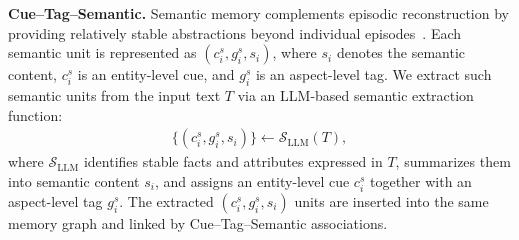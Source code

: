 \textbf{Cue--Tag--Semantic.}
Semantic memory complements episodic reconstruction by providing relatively stable abstractions beyond individual episodes~\cite{anokhin2024arigraph,hu2025memory}.
Each semantic unit is represented as $(c^s_i, g^s_i, s_i)$, where $s_i$ denotes the semantic content, $c^s_i$ is an entity-level cue, and $g^s_i$ is an aspect-level tag.
We extract such semantic units from the input text $T$ via an LLM-based semantic extraction function:
\begin{align}
\{(c^s_i, g^s_i, s_i)\} \leftarrow \mathcal{S}_{\text{LLM}}(T),
\end{align}
where $\mathcal{S}_{\text{LLM}}$ identifies stable facts and attributes expressed in $T$, summarizes them into semantic content $s_i$,
and assigns an entity-level cue $c^s_i$ together with an aspect-level tag $g^s_i$.
The extracted $(c^s_i, g^s_i, s_i)$ units are inserted into the same memory graph and linked by Cue--Tag--Semantic associations.

